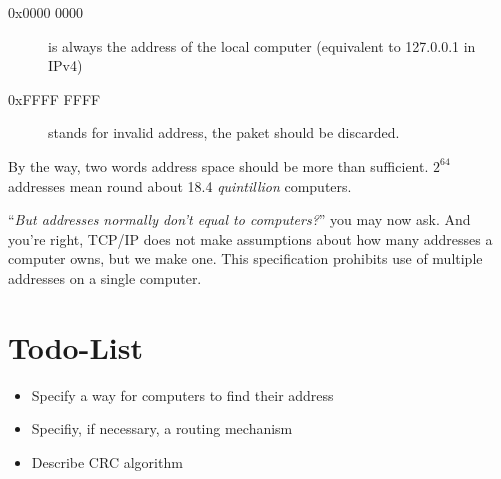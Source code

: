 \documentclass[12pt,a4paper,english,DIV=15,oneside,parskip=half]{scrartcl}
\begin{document}
\begin{description}
\item[0x0000 0000] is always the address of the local computer (equivalent to 127.0.0.1 in IPv4)
\item[0xFFFF FFFF] stands for invalid address, the paket should be discarded.
\end{description}

By the way, two words address space should be more than sufficient. $2^{64}$ addresses mean round about 18.4 \emph{quintillion} computers.

\enquote{\emph{But addresses normally don\rq{}t equal to computers?}} you may now ask. And you\rq{}re right, TCP/IP does not make assumptions about how many addresses a computer owns, but we make one. This specification prohibits use of multiple addresses on a single computer.

\section{Todo-List}

\begin{itemize}
\item Specify a way for computers to find their address
\item Specifiy, if necessary, a routing mechanism
\item Describe CRC algorithm
\end{itemize}
\end{document}
